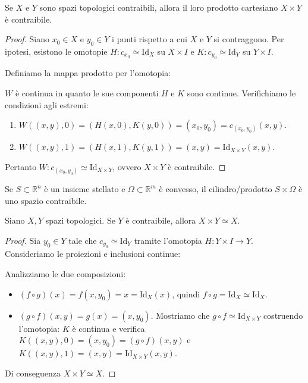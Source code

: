 \begin{prop}
Se $X$ e $Y$ sono spazi topologici contraibili, allora il loro prodotto cartesiano $X \times Y$ è contraibile.
\end{prop}

\begin{proof}
Siano $x_0 \in X$ e $y_0 \in Y$ i punti rispetto a cui $X$ e $Y$ si contraggono.
Per ipotesi, esistono le omotopie $H: c_{x_0} \simeq \mathrm{Id}_X$ su $X \times I$ e $K: c_{y_0} \simeq \mathrm{Id}_Y$ su $Y \times I$.

Definiamo la mappa prodotto per l'omotopia:

$W$ è continua in quanto le sue componenti $H$ e $K$ sono continue. Verifichiamo le condizioni agli estremi:
\begin{enumerate}[label=\roman*)]
    \item $W((x,y), 0) = (H(x,0), K(y,0)) = (x_0, y_0) = c_{(x_0,y_0)}(x,y)$.
    \item $W((x,y), 1) = (H(x,1), K(y,1)) = (x,y) = \mathrm{Id}_{X \times Y}(x,y)$.
\end{enumerate}
Pertanto $W: c_{(x_0,y_0)} \simeq \mathrm{Id}_{X \times Y}$, ovvero $X \times Y$ è contraibile.
\end{proof}

\begin{ejemplo}
Se $S \subset \mathbb{R}^n$ è un insieme stellato e $\Omega \subset \mathbb{R}^m$ è convesso, il cilindro/prodotto $S \times \Omega$ è uno spazio contraibile.
\end{ejemplo}

\begin{prop}
Siano $X, Y$ spazi topologici. Se $Y$ è contraibile, allora $X \times Y \simeq X$.
\end{prop}

\begin{proof}
Sia $y_0 \in Y$ tale che $c_{y_0} \simeq \mathrm{Id}_Y$ tramite l'omotopia $H: Y \times I \to Y$.
Consideriamo le proiezioni e inclusioni continue:

Analizziamo le due composizioni:
\begin{itemize}
    \item $(f \circ g)(x) = f(x, y_0) = x = \mathrm{Id}_X(x)$, quindi $f \circ g = \mathrm{Id}_X \simeq \mathrm{Id}_X$.
    \item $(g \circ f)(x,y) = g(x) = (x, y_0)$. Mostriamo che $g \circ f \simeq \mathrm{Id}_{X \times Y}$ costruendo l'omotopia:
    $K$ è continua e verifica $K((x,y),0) = (x, y_0) = (g \circ f)(x,y)$ e $K((x,y),1) = (x, y) = \mathrm{Id}_{X \times Y}(x,y)$.
\end{itemize}
Di conseguenza $X \times Y \simeq X$.
\end{proof}

